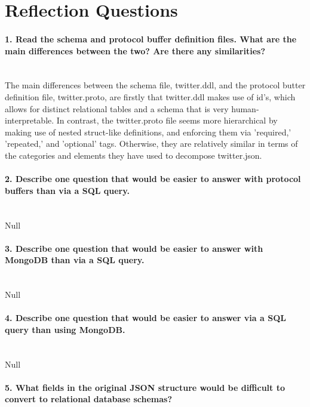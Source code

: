 \documentclass[12pt]{article}
\let\oldsection\section
\renewcommand\section{\clearpage\oldsection}
\begin{document}


\section*{Reflection Questions}

\paragraph{1. Read the schema and protocol buffer definition files. What are the main differences between the two? Are there any similarities?}\mbox{}\\ 

The main differences between the schema file, twitter.ddl, and the protocol butter definition file, twitter.proto, are firstly that twitter.ddl makes use of id's, which allows for distinct relational tables and a schema that is very human-interpretable. In contrast, the twitter.proto file seems more hierarchical by making use of nested struct-like definitions, and enforcing them via 'required,' 'repeated,' and 'optional' tags. Otherwise, they are relatively similar in terms of the categories and elements they have used to decompose twitter.json.

\paragraph{2. Describe one question that would be easier to answer with protocol buffers than via a SQL query.}\mbox{}\\

Null

\paragraph{3. Describe one question that would be easier to answer with MongoDB than via a SQL query.}\mbox{}\\

Null

\paragraph{4. Describe one question that would be easier to answer via a SQL query than using MongoDB.}\mbox{}\\

Null

\paragraph{5. What fields in the original JSON structure would be difficult to convert to relational database schemas?}\mbox{}\\
\end{document}
